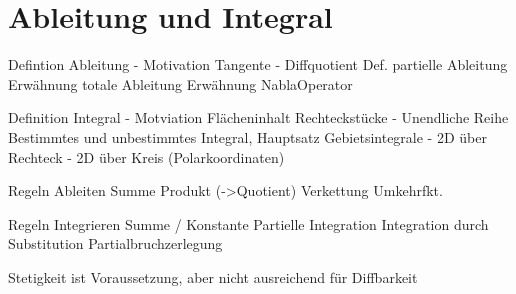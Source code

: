 \chapter{Ableitung und Integral}

Defintion Ableitung
  - Motivation Tangente
  - Diffquotient
Def. partielle Ableitung
Erwähnung totale Ableitung
Erwähnung NablaOperator

Definition Integral
 - Motviation Flächeninhalt Rechteckstücke
 - Unendliche Reihe
Bestimmtes und unbestimmtes Integral, Hauptsatz
  Gebietsintegrale
    - 2D über Rechteck
    - 2D über Kreis (Polarkoordinaten)

Regeln Ableiten
  Summe
  Produkt (->Quotient)
  Verkettung
  Umkehrfkt.

Regeln Integrieren
  Summe / Konstante
  Partielle Integration
  Integration durch Substitution
  Partialbruchzerlegung


Stetigkeit ist Voraussetzung, aber nicht ausreichend für Diffbarkeit